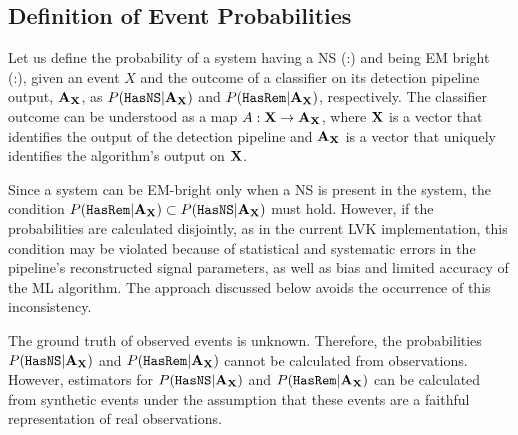 \subsection*{Definition of Event Probabilities}

Let us define the probability of a system having a \ac{NS} (\hasns:\true) and being \ac{EM} bright (\hasrem:\true), given an event $X$ and the outcome of a classifier on its detection pipeline
output, ${\bf A}_{\bf X}$, as $P({{\tt HasNS}}|{\bf A}_{\bf X})$ and $P({{\tt HasRem}}|{\bf A}_{\bf X})$, respectively. The classifier outcome can be understood as a map $A:{\bf X}\to {\bf A}_{\bf X}$, where
$\bf X$ is a vector that identifies the output of the detection pipeline and ${\bf A}_{\bf X}$ is a vector that uniquely identifies the algorithm's output on $\bf X$. 

Since a system can be EM-bright only when a \ac{NS} is present in the system, the condition $P({{\tt HasRem}}|{\bf A}_{\bf X})\subset P({{\tt HasNS}}|{\bf A}_{\bf X})$ must hold. However, if the probabilities
are calculated disjointly, as in the current \ac{LVK} implementation, this condition may be violated because of statistical and systematic errors in the pipeline's reconstructed signal
parameters, as well as bias and limited accuracy of the \ac{ML} algorithm. The approach discussed below avoids the occurrence of this inconsistency.

The ground truth of observed events is unknown. Therefore, the probabilities $P({{\tt HasNS}}|{\bf A}_{\bf X})$ and $P({{\tt HasRem}}|{\bf A}_{\bf X})$ cannot be calculated from observations. However,
estimators for $P({{\tt HasNS}}|{\bf A}_{\bf X})$ and $P({{\tt HasRem}}|{\bf A}_{\bf X})$ can be calculated from synthetic events under the assumption that these events are a faithful representation of
real observations.

